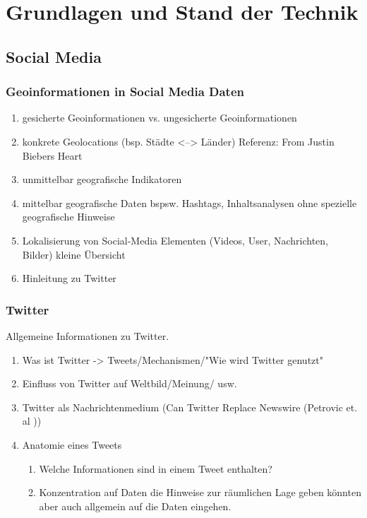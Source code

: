 \chapter{Grundlagen und Stand der Technik} 


	\section{Social Media}

		\subsection{Geoinformationen in Social Media Daten}
	 		\begin{enumerate}
	 			\item {} gesicherte Geoinformationen vs. ungesicherte Geoinformationen
	 			\item konkrete Geolocations (bsp. Städte <--> Länder) Referenz: From Justin Biebers Heart 
	 			\item unmittelbar geografische Indikatoren
				\item mittelbar geografische Daten bspsw. Hashtags, Inhaltsanalysen ohne spezielle geografische Hinweise
	 			\item Lokalisierung von Social-Media Elementen (Videos, User, Nachrichten, Bilder) kleine Übersicht
	 			\item Hinleitung zu Twitter  
	 		\end{enumerate}

		\subsection{Twitter}
			Allgemeine Informationen zu Twitter. 
			\begin{enumerate}
				\item Was ist Twitter -> Tweets/Mechanismen/"Wie wird Twitter genutzt"
				\item {} Einfluss von Twitter auf Weltbild/Meinung/ usw.
				\item Twitter als Nachrichtenmedium (Can Twitter Replace Newswire (Petrovic et. al ))
				\item Anatomie eines Tweets 
					\begin{enumerate}
						\item Welche Informationen sind in einem Tweet enthalten? 
						\item Konzentration auf Daten die Hinweise zur räumlichen Lage geben könnten aber auch allgemein auf die Daten eingehen.
					\end{enumerate}
			\end{enumerate}
	

